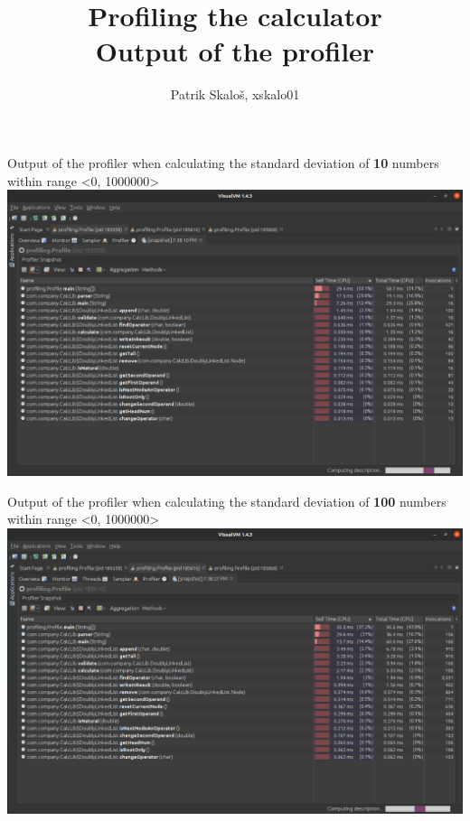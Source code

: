 \documentclass{article}
\title{\vspace{4cm}\Huge{Profiling the calculator} \\ \vspace{1cm} \LARGE{Output of the profiler}\vfill}
\author{Patrik Skaloš, xskalo01 \vspace{5cm}}
\date{}
\begin{document}
  \begin{landscape}

    \maketitle

    \begin{center}

      \Large{Output of the profiler when calculating the standard deviation of \textbf{10} numbers within range \textless 0, 1000000\textgreater}\\
      \vspace{1cm}
      \includegraphics[width=26cm]{profiling_result-10_numbers.eps}

      \newpage

      \Large{Output of the profiler when calculating the standard deviation of \textbf{100} numbers within range \textless 0, 1000000\textgreater}\\
      \vspace{1cm}
      \includegraphics[width=26cm]{profiling_result-100_numbers.eps}


\end{center}
\end{landscape}
\end{document}
